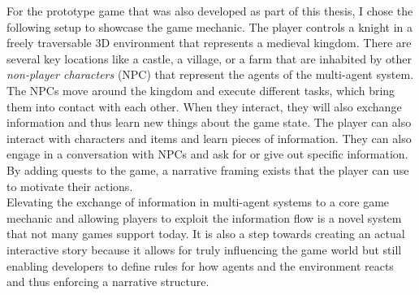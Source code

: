 For the prototype game that was also developed as part of this thesis, I chose the following setup to showcase the game mechanic. The player controls a knight in a freely traversable 3D environment that represents a medieval kingdom. There are several key locations like a castle, a village, or a farm that are inhabited by other \textit{non-player characters} (NPC) that represent the agents of the multi-agent system. The NPCs move around the kingdom and execute different tasks, which bring them into contact with each other. When they interact, they will also exchange information and thus learn new things about the game state. The player can also interact with characters and items and learn pieces of information. They can also engage in a conversation with NPCs and ask for or give out specific information. By adding quests to the game, a narrative framing exists that the player can use to motivate their actions.\\
Elevating the exchange of information in multi-agent systems to a core game mechanic and allowing players to exploit the information flow is a novel system that not many games support today. It is also a step towards creating an actual interactive story because it allows for truly influencing the game world but still enabling developers to define rules for how agents and the environment reacts and thus enforcing a narrative structure.
